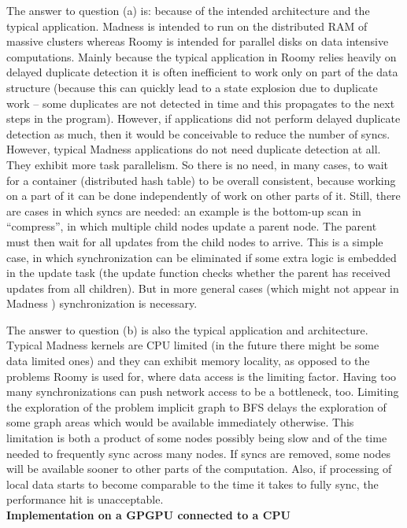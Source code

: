\documentclass{article}
\begin{document}
\begin{enumerate}
The answer to question (a) is: because of the intended architecture and the
typical application. Madness is intended to run on the distributed RAM of
massive clusters whereas Roomy is intended for parallel disks on data intensive
computations.  Mainly because the typical application in Roomy relies heavily
on delayed duplicate detection it is often inefficient to work only on part of
the data structure (because this can quickly lead to a state explosion due to
duplicate work -- some duplicates are not detected in time and this propagates
to the next steps in the program). However, if applications did not perform
delayed duplicate detection as much, then it would be conceivable to reduce the
number of syncs. However, typical Madness applications do not need duplicate
detection at all. They exhibit more task parallelism. So there is no need, in
many cases, to wait for a container (distributed hash table) to be overall
consistent, because working on a part of it can be done independently of
work on other parts of it. Still, there are cases in which syncs are needed:
an example is the bottom-up scan in ``compress'', in which multiple child nodes
update a parent node. The parent must then wait for all updates from the child
nodes to arrive. This is a simple case, in which synchronization can be eliminated
if some extra logic is embedded in the update task (the update function
checks whether the parent has received updates from all children). But in
more general cases (which might not appear in Madness ) synchronization is necessary.

The answer to question (b) is also the typical application and architecture.
Typical Madness kernels are CPU limited (in the future there might be some data limited ones)
and they can exhibit memory locality, as opposed to the problems Roomy is used for, where data access is the
limiting factor. Having too many synchronizations can push network access to be a bottleneck,
too. Limiting the exploration of the problem implicit graph to BFS delays the exploration
of some graph areas which would be available immediately otherwise. This limitation
is both a product of some nodes possibly being slow and of the time needed to frequently
sync across many nodes. If syncs are removed, some nodes will be available sooner to
other parts of the computation. Also, if processing of local data starts to become comparable 
to the time it takes to fully sync, the performance hit is unacceptable.\\

{\bf Implementation on a GPGPU connected to a CPU}\\


\end{enumerate}
\end{document}
